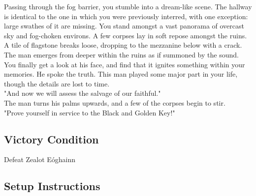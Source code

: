 Passing through the fog barrier, you stumble into a dream-like scene. The hallway is identical to the one in which you were previously interred, with one exception: large swathes of it are missing. You stand amongst a vast panorama of overcast sky and fog-choken environs. A few corpses lay in soft repose amongst the ruins.\\

A tile of flagstone breaks loose, dropping to the mezzanine below with a crack.\\

The man emerges from deeper within the ruins as if summoned by the sound. You finally get a look at his face, and find that it ignites something within your memories. He spoke the truth. This man played some major part in your life, though the details are lost to time.\\

"And now we will assess the salvage of our faithful."\\

The man turns his palms upwards, and a few of the corpses begin to stir.\\

"Prove yourself in service to the Black and Golden Key!"\\

\subsection*{Victory Condition}
Defeat Zealot Eóghainn

\subsection*{Setup Instructions}
\begin{center}
\end{center}

